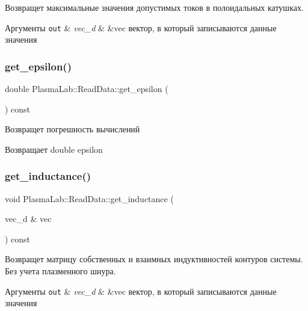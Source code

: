 Возвращет максимальные значения допустимых токов в полоидальных катушках. 
\begin{DoxyParams}[1]{Аргументы}
\mbox{\tt out}  & {\em vec\+\_\+d} & \&vec вектор, в который записываются данные значения \\
\hline
\end{DoxyParams}
\mbox{\label{class_plasma_lab_1_1_read_data_ae87a4c976fd74d8af2684e0545cac95e}} 
\subsubsection{\texorpdfstring{get\+\_\+epsilon()}{get\_epsilon()}}
{\footnotesize\ttfamily double Plasma\+Lab\+::\+Read\+Data\+::get\+\_\+epsilon (\begin{DoxyParamCaption}{ }\end{DoxyParamCaption}) const\hspace{0.3cm}{\ttfamily [inline]}}

Возвращет погрешность вычислений \begin{DoxyReturn}{Возвращает}
double epsilon 
\end{DoxyReturn}
\mbox{\label{class_plasma_lab_1_1_read_data_ad16bd5ea594f06932eb709f179e586b5}} 
\subsubsection{\texorpdfstring{get\+\_\+inductance()}{get\_inductance()}}
{\footnotesize\ttfamily void Plasma\+Lab\+::\+Read\+Data\+::get\+\_\+inductance (\begin{DoxyParamCaption}\item[{vec\+\_\+d \&}]{vec }\end{DoxyParamCaption}) const\hspace{0.3cm}{\ttfamily [inline]}}

Возвращет матрицу собственных и взаимных индуктивностей контуров системы. Без учета плазменного шнура. 
\begin{DoxyParams}[1]{Аргументы}
\mbox{\tt out}  & {\em vec\+\_\+d} & \&vec вектор, в который записываются данные значения \\
\hline
\end{DoxyParams}
\mbox{\label{class_plasma_lab_1_1_read_data_a9137f02d7904f2121c09386921a644e4}} 
